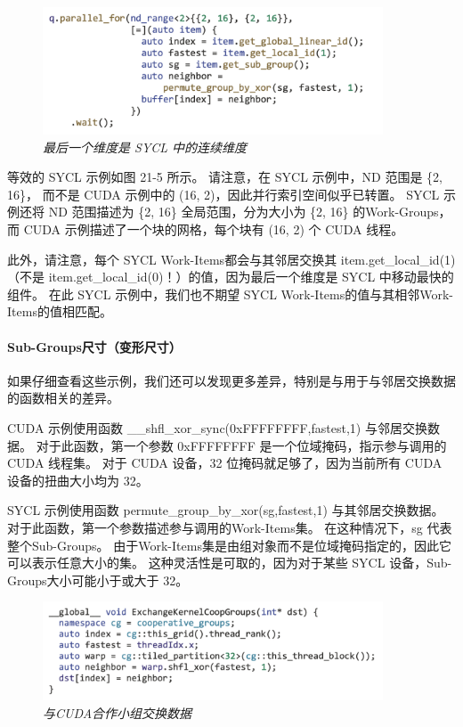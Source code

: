 \begin{figure}[H]
	\centering
	\includegraphics[width=0.9\textwidth]{figs/F21.5.png}
	\caption{\textit{最后一个维度是 SYCL 中的连续维度 }}
\end{figure}

等效的 SYCL 示例如图 21-5 所示。 请注意，在 SYCL 示例中，ND 范围是 \{2, 16\}，
而不是 CUDA 示例中的 (16, 2)，因此并行索引空间似乎已转置。 
SYCL 示例还将 ND 范围描述为 \{2, 16\} 全局范围，分为大小为 \{2, 16\} 的Work-Groups，
而 CUDA 示例描述了一个块的网格，每个块有 (16, 2) 个 CUDA 线程。

此外，请注意，每个 SYCL Work-Items都会与其邻居交换其 item.get\_local\_id(1)
（不是 item.get\_local\_id(0)！）的值，因为最后一个维度是 SYCL 中移动最快的组件。 
在此 SYCL 示例中，我们也不期望 SYCL Work-Items的值与其相邻Work-Items的值相匹配。

\paragraph{Sub-Groups尺寸（变形尺寸）}

如果仔细查看这些示例，我们还可以发现更多差异，特别是与用于与邻居交换数据的函数相关的差异。

CUDA 示例使用函数 \_\_shfl\_xor\_sync(0xFFFFFFFF,fastest,1) 与邻居交换数据。 
对于此函数，第一个参数 0xFFFFFFFF 是一个位域掩码，指示参与调用的 CUDA 线程集。 
对于 CUDA 设备，32 位掩码就足够了，因为当前所有 CUDA 设备的扭曲大小均为 32。

SYCL 示例使用函数 permute\_group\_by\_xor(sg,fastest,1) 与其邻居交换数据。 
对于此函数，第一个参数描述参与调用的Work-Items集。 在这种情况下，sg 代表整个Sub-Groups。 
由于Work-Items集是由组对象而不是位域掩码指定的，因此它可以表示任意大小的集。 
这种灵活性是可取的，因为对于某些 SYCL 设备，Sub-Groups大小可能小于或大于 32。

\begin{figure}[H]
	\centering
	\includegraphics[width=0.9\textwidth]{figs/F21.6.png}
	\caption{\textit{与CUDA合作小组交换数据 }}
\end{figure}

